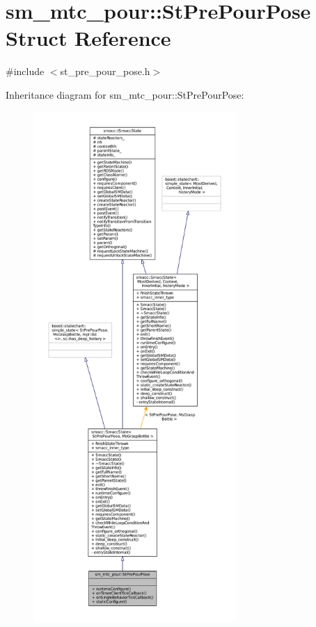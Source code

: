 \hypertarget{structsm__mtc__pour_1_1StPrePourPose}{}\section{sm\+\_\+mtc\+\_\+pour\+:\+:St\+Pre\+Pour\+Pose Struct Reference}
\label{structsm__mtc__pour_1_1StPrePourPose}


{\ttfamily \#include $<$st\+\_\+pre\+\_\+pour\+\_\+pose.\+h$>$}



Inheritance diagram for sm\+\_\+mtc\+\_\+pour\+:\+:St\+Pre\+Pour\+Pose\+:
\nopagebreak
\begin{figure}[H]
\begin{center}
\leavevmode
\includegraphics[height=550pt]{structsm__mtc__pour_1_1StPrePourPose__inherit__graph}
\end{center}
\end{figure}


